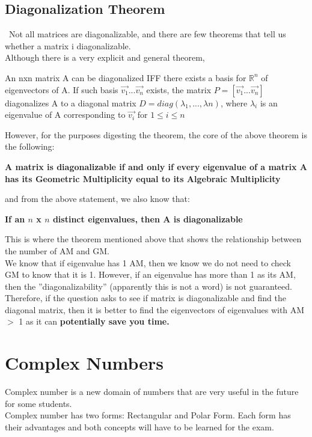\documentclass[12pt]{article}
\newcommand{\R}{\mathbb{R}}
\begin{document}
\subsection{Diagonalization Theorem}\
Not all matrices are diagonalizable, and there are few theorems that tell us whether a matrix i diagonalizable. \\
Although there is a very explicit and general theorem,\\
\begin{center}
\noindent
An nxn matrix A can be diagonalized IFF there exists a basis for $\R^n$ of eigenvectors of A. 
If such basis ${\vec{v_1}...\vec{v_n}}$ exists, the matrix $P = [\vec{v_1}...\vec{v_n}]$ diagonalizes A to a diagonal matrix $D = diag(\lambda_1,...,\lambda{n})$, where $\lambda_i$ is an eigenvalue of A corresponding to $\vec{v_i}$ for $1\leq i \leq n$\\
\end{center}
\noindent
However, for the purposes digesting the theorem, the core of the above theorem is the following:\\
\begin{center}
\textbf{A matrix is diagonalizable if and only if every eigenvalue of a matrix A has its Geometric Multiplicity equal to its Algebraic Multiplicity}
\end{center}
\noindent
and from the above statement, we also know that:\\
\begin{center}
\textbf{If an $n$ x $n$ distinct eigenvalues, then A is diagonalizable}
\end{center}
\noindent
This is where the theorem mentioned above that shows the relationship between the number of AM and GM.\\
We know that if eigenvalue has 1 AM, then we know we do not need to check GM to know that it is 1. However, if an eigenvalue has more than 1 as its AM, then the ''diagonalizability'' (apparently this is not a word) is not guaranteed.  Therefore, if the question asks to see if matrix is diagonalizable and find the diagonal matrix, then it is better to find the eigenvectors of eigenvalues with AM $>$ 1 as it can \textbf{potentially save you time.}

\section{Complex Numbers}
Complex number is a new domain of numbers that are very useful in the future for some students.\\
Complex number has two forms: Rectangular and Polar Form. Each form has their advantages and both concepts will have to be learned for the exam.\\
\end{document}
